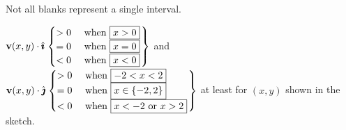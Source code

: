 \begin{hint} 
Not all blanks represent a single interval.
\end{hint}

\begin{answer} 
$\mathbf{v}(x,y)\cdot \hat{\pmb{\imath}} \left.\begin{cases}
>0 & \mbox{ when } \fbox{$x>0$}\\
=0 &\mbox{ when } \fbox{$x=0$}\\
<0&\mbox{ when } \fbox{$x<0$}
\end{cases}\right\}$
and
$\mathbf{v}(x,y)\cdot \hat{\pmb{\jmath}} \left.\begin{cases}
>0 & \mbox{ when } \fbox{$-2<x<2$}\\
=0 &\mbox{ when } \fbox{$x \in \{-2,2\}$}\\
<0&\mbox{ when } \fbox{$x<-2$ or $x>2$}
\end{cases}\right\}$\quad
at least for $(x,y)$ shown in the sketch.
\end{answer}

